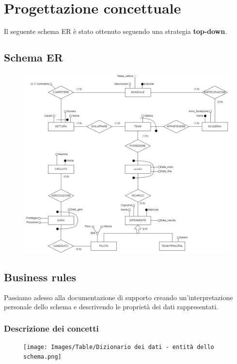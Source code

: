 \section{Progettazione concettuale}
Il seguente schema ER è stato ottenuto seguendo una strategia \textbf{top-down}.

\subsection{Schema ER}
\begin{figure}[H]
    \centering
    \includegraphics[scale = 0.73]{Images/ER.png}
\end{figure}

\newpage
\subsection{Business rules}
Passiamo adesso alla documentazione di supporto creando un'interpretazione personale dello schema e descrivendo le proprietà dei dati rappresentati.

\subsubsection{Descrizione dei concetti}

\begin{figure}[H]
    \centering
    \texttt{[image: Images/Table/Dizionario dei dati - entità dello schema.png]}
\end{figure}


